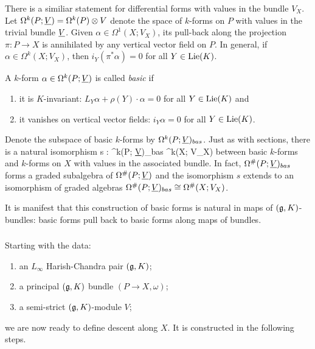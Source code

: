 \documentclass[10pt]{amsart}
\begin{document}
There is a similiar statement for differential forms with values in the bundle $V_X$. Let $\Omega^k(P ; \underline{V}) = \Omega^k(P) \otimes V$ denote the space of $k$-forms on $P$ with values in the trivial bundle $\underline{V}$. Given $\alpha \in \Omega^1(X ; V_X)$, its pull-back along the projection $\pi: P \to X$ is annihilated by any vertical vector field on $P$. In general, if $\alpha \in \Omega^k(X; V_X)$, then $i_Y(\pi^*\alpha) = 0$ for all $Y \in {\rm Lie}(K)$.

\begin{dfn} A $k$-form $\alpha \in \Omega^k(P; \underline{V})$ is called {\em basic} if 
\begin{enumerate}
\item it is $K$-invariant: $L_Y \alpha + \rho(Y) \cdot \alpha = 0 $ for all $Y \in {\rm Lie}(K)$ and
\item  it vanishes on vertical vector fields: $i_Y \alpha = 0$ for all $Y \in {\rm Lie}(K)$. 
\end{enumerate}
\end{dfn}

Denote the subspace of basic $k$-forms by $\Omega^k(P; \underline{V})_{bas}$. Just as with sections, there is a natural isomorphism
\ben
s : \Omega^k(P; \ul{V})_{bas} \xto{\cong} \Omega^k(X; V_X) 
\een
between basic $k$-forms and $k$-forms on $X$ with values in the associated bundle.
In fact, $\Omega^{\#}(P; \underline{V})_{bas}$ forms a graded subalgebra of $\Omega^{\#}(P; \underline{V})$ and the isomorphism $s$ extends to an isomorphism of graded algebras $\Omega^{\#}(P; \underline{V})_{bas} \cong \Omega^{\#}(X; V_X)$.

It is manifest that this construction of basic forms is natural in maps of $(\mathfrak g,K)$-bundles: basic forms pull back to basic forms along maps of bundles.

\subsubsection{}

Starting with the data:
\begin{enumerate}
\item an $L_\infty$ Harish-Chandra pair $(\mathfrak g,K)$;
\item a principal $(\mathfrak g,K)$ bundle $(P \to X, \omega)$;
\item a semi-strict $(\mathfrak g,K)$-module $V$;
\end{enumerate}
we are now ready to define descent along $X$. 
It is constructed in the following steps.
\end{document}
